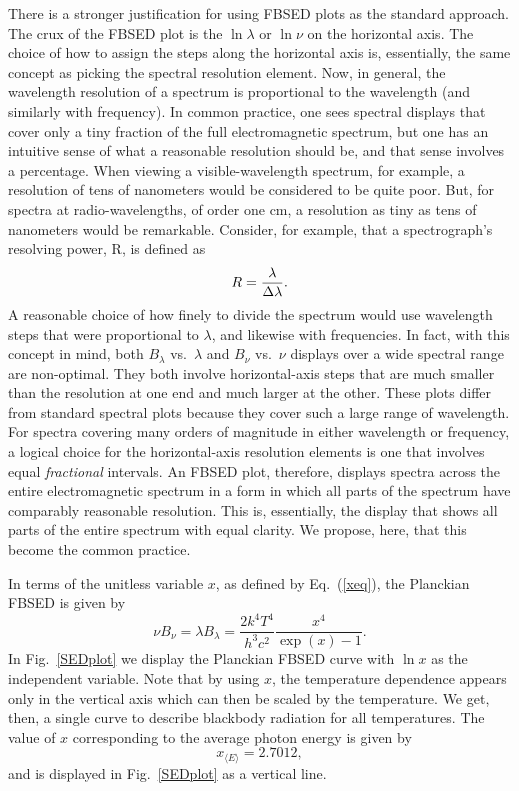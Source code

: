 \documentclass[12pt,aps,prb,preprint]{revtex4}   %
\begin{document}
There is a stronger justification for using FBSED plots as the standard approach.
The crux of the FBSED plot is the $\ln\lambda$ or $\ln\nu$ on the horizontal axis.  The choice of how to assign the steps along the horizontal axis is, essentially, the same concept as picking the spectral resolution element.  Now, in general, the wavelength resolution of a spectrum is proportional to the wavelength (and similarly with frequency).  In common practice, one sees spectral displays that cover only a tiny fraction of the full electromagnetic spectrum, but one has an intuitive sense of what a reasonable resolution should be, and that sense involves a percentage.  When viewing a visible-wavelength spectrum, for example, a resolution of tens of nanometers would be considered to be quite poor.  But, for spectra at radio-wavelengths, of order one cm, a resolution as tiny as tens of nanometers would be remarkable.  Consider, for example, that a spectrograph's resolving power, R, is defined as\cite{BGO} 
\begin{equation}
R = {\lambda \over \Delta\lambda}.
\end{equation}
A reasonable choice of how finely to divide the spectrum would use wavelength steps that were proportional to $\lambda$, and likewise with frequencies.  In fact, with this concept in mind, both $B_\lambda$ vs.\ $\lambda$ and $B_\nu$ vs.\ $\nu$ displays over a wide spectral range are non-optimal. They both involve horizontal-axis steps that are much smaller than the resolution 
at one end and much larger at the other.  These plots differ from standard spectral plots because they cover such a large range of wavelength.  For spectra covering many orders of magnitude in either wavelength or frequency, a logical choice for the horizontal-axis resolution elements is one that involves equal {\it fractional} intervals.  An FBSED plot, therefore, displays spectra across the entire electromagnetic spectrum in a form in which all parts of the spectrum have comparably reasonable resolution. This is, essentially, the display that shows all parts of the entire spectrum with equal clarity.  We propose, here, that this become the common practice.  

In terms of the unitless variable $x$, as defined by Eq.~(\ref{xeq}), the Planckian FBSED is given by
\begin{equation}
\label{SEDva2}
\nu B_\nu = \lambda B_\lambda = \frac{2k^4T^4}{h^3c^2}\frac{x^4}{\exp(x)-1}.
\end{equation}
In Fig.~\ref{SEDplot} we display the Planckian FBSED curve with $\ln x$ as the independent variable.  Note that by using $x$, the temperature dependence appears only in the vertical axis which can then be scaled by the temperature.  We get, then, a single curve to describe blackbody radiation for all temperatures.  The value of $x$ corresponding to the average photon energy is given by
\begin{equation}
\label{avgx}
x_{\langle E\rangle}= 2.7012,
\end{equation}
and is displayed in Fig.~\ref{SEDplot} as a vertical line.
\end{document}

